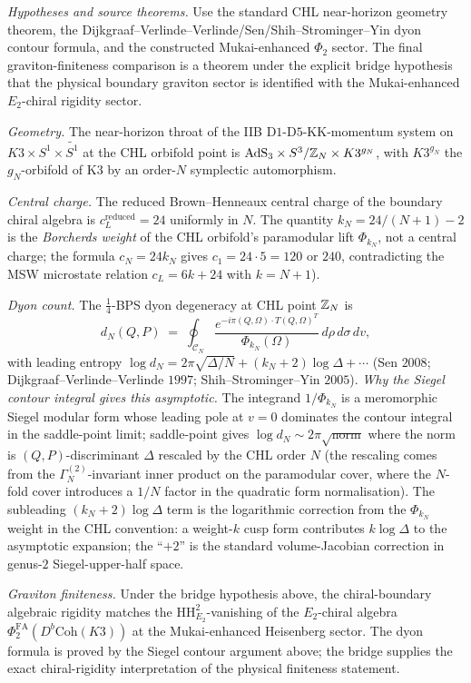 \begin{theorem}
\label{wn:thm:spine-AdS3}
\emph{Hypotheses and source theorems.}  Use the standard CHL near-horizon
geometry theorem, the Dijkgraaf--Verlinde--Verlinde/Sen/Shih--Strominger--Yin
dyon contour formula, and the constructed Mukai-enhanced $\Phi_2$ sector.
The final graviton-finiteness comparison is a theorem under the explicit
bridge hypothesis that the physical boundary graviton sector is identified
with the Mukai-enhanced $E_2$-chiral rigidity sector.

\emph{Geometry.} The near-horizon throat of the IIB
D$1$-D$5$-KK-momentum system on $K3 \times S^1 \times \widetilde{S^1}$
at the CHL orbifold point is
$\mathrm{AdS}_3 \times S^3/\mathbb{Z}_N \times K3^{g_N}$, with $K3^{g_N}$
the $g_N$-orbifold of K3 by an order-$N$ symplectic automorphism.

\emph{Central charge.} The reduced Brown--Henneaux central charge of
the boundary chiral algebra is $c_L^{\mathrm{reduced}} = 24$ uniformly
in $N$. The quantity $k_N = 24/(N+1) - 2$ is the \emph{Borcherds weight}
of the CHL orbifold's paramodular lift $\Phi_{k_N}$, not a central
charge; the formula $c_N = 24 k_N$ gives
$c_1 = 24 \cdot 5 = 120$ or $240$, contradicting the MSW microstate
relation $c_L = 6k + 24$ with $k = N + 1$).

\emph{Dyon count.} The $\tfrac{1}{4}$-BPS dyon degeneracy at CHL point
$\mathbb{Z}_N$ is
\[
d_N(Q, P) \;=\; \oint_{\mathcal{C}_N}
\frac{e^{-i\pi (Q, \Omega) \cdot T (Q, \Omega)^T}}{\Phi_{k_N}(\Omega)}\,
d\rho\, d\sigma\, dv,
\]
with leading entropy
$\log d_N = 2\pi\sqrt{\Delta/N} + (k_N + 2)\log\Delta + \cdots$
(Sen $2008$; Dijkgraaf--Verlinde--Verlinde $1997$;
Shih--Strominger--Yin $2005$).
\emph{Why the Siegel contour integral gives this asymptotic.} The
integrand $1/\Phi_{k_N}$ is a meromorphic Siegel modular form whose
leading pole at $v = 0$ dominates the contour integral in the
saddle-point limit; saddle-point gives
$\log d_N \sim 2\pi\sqrt{\text{norm}}$ where the norm is
$(Q, P)$-discriminant $\Delta$ rescaled by the CHL order $N$ (the
rescaling comes from the $\Gamma^{(2)}_N$-invariant inner product on
the paramodular cover, where the $N$-fold cover introduces a $1/N$
factor in the quadratic form normalisation). The subleading
$(k_N + 2)\log\Delta$ term is the logarithmic correction from the
$\Phi_{k_N}$ weight in the CHL convention: a weight-$k$ cusp form contributes
$k \log \Delta$ to the asymptotic expansion; the ``$+ 2$'' is the
standard volume-Jacobian correction in genus-$2$ Siegel-upper-half
space.

\emph{Graviton finiteness.} Under the bridge hypothesis above, the
chiral-boundary algebraic rigidity matches the
$\mathrm{HH}^2_{E_2}$-vanishing of the $E_2$-chiral algebra
$\Phi_2^{\mathrm{FA}}(D^b\mathrm{Coh}(K3))$ at the Mukai-enhanced
Heisenberg sector. The dyon formula is proved by the Siegel contour
argument above; the bridge supplies the exact chiral-rigidity
interpretation of the physical finiteness statement.
\end{theorem}

